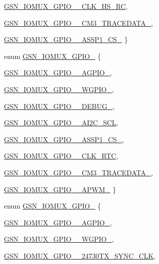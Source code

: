 \begin{DoxyCompactItemize}
\hyperlink{a00519_a8918e3cd7c1af54b48633d283956507fa2935106f00ea03ff214cb97f5e957bac}{GSN\_\-IOMUX\_\-GPIO\_\_\-CLK\_\-HS\_\-RC}, 
\par
\hyperlink{a00519_a8918e3cd7c1af54b48633d283956507fa44866ea0a6864b9cd29847a2b3714926}{GSN\_\-IOMUX\_\-GPIO\_\_\-CM3\_\-TRACEDATA\_}, 
\par
\hyperlink{a00519_a8918e3cd7c1af54b48633d283956507fa02d0577e9b3225bb6ef3aded051dd366}{GSN\_\-IOMUX\_\-GPIO\_\_\-ASSP1\_\-CS\_}
 \}
\item 
enum \hyperlink{a00519_a47468174de6c5c56ca525f9cf4c08e75}{GSN\_\-IOMUX\_\-GPIO\_} \{ \par
\hyperlink{a00519_a47468174de6c5c56ca525f9cf4c08e75a0bec9e0e816dc908489dcded2e69a9c6}{GSN\_\-IOMUX\_\-GPIO\_\_\-AGPIO\_}, 
\par
\hyperlink{a00519_a47468174de6c5c56ca525f9cf4c08e75a1806afc72cb6d610f058691c7c00dc6e}{GSN\_\-IOMUX\_\-GPIO\_\_\-WGPIO\_}, 
\par
\hyperlink{a00519_a47468174de6c5c56ca525f9cf4c08e75afe73c0413c2643b0fcbc24e3bb3f49ba}{GSN\_\-IOMUX\_\-GPIO\_\_\-DEBUG\_}, 
\par
\hyperlink{a00519_a47468174de6c5c56ca525f9cf4c08e75a7161ef284a5020c9249adad1ec5f663f}{GSN\_\-IOMUX\_\-GPIO\_\_\-AI2C\_\-SCL}, 
\par
\hyperlink{a00519_a47468174de6c5c56ca525f9cf4c08e75a4f2f4369a732e07c87b8cff960b44ae9}{GSN\_\-IOMUX\_\-GPIO\_\_\-ASSP1\_\-CS\_}, 
\par
\hyperlink{a00519_a47468174de6c5c56ca525f9cf4c08e75aef5b802d7cda2b00405550d2b168547e}{GSN\_\-IOMUX\_\-GPIO\_\_\-CLK\_\-RTC}, 
\par
\hyperlink{a00519_a47468174de6c5c56ca525f9cf4c08e75a070c0ba22456d04ceb809deabb85132c}{GSN\_\-IOMUX\_\-GPIO\_\_\-CM3\_\-TRACEDATA\_}, 
\par
\hyperlink{a00519_a47468174de6c5c56ca525f9cf4c08e75af3381cc727c0146831ddbbb293665127}{GSN\_\-IOMUX\_\-GPIO\_\_\-APWM\_}
 \}
\item 
enum \hyperlink{a00519_ac07a70f0fad08cb5cef238bee66f366f}{GSN\_\-IOMUX\_\-GPIO\_} \{ \par
\hyperlink{a00519_ac07a70f0fad08cb5cef238bee66f366fa9f287c911680e3f02e5251d6bfac169f}{GSN\_\-IOMUX\_\-GPIO\_\_\-AGPIO\_}, 
\par
\hyperlink{a00519_ac07a70f0fad08cb5cef238bee66f366facd79cd69901d32d935707bb6adf26491}{GSN\_\-IOMUX\_\-GPIO\_\_\-WGPIO\_}, 
\par
\hyperlink{a00519_ac07a70f0fad08cb5cef238bee66f366fac810af32f9b6bb6203c420bfc5606d4e}{GSN\_\-IOMUX\_\-GPIO\_\_\-24730TX\_\-SYNC\_\-CLK}, 

\end{DoxyCompactItemize}
